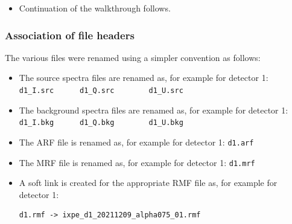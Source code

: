 	\begin{itemize}
		\item Continuation of the walkthrough follows.
	\end{itemize}
	
	\subsubsection*{Association of file headers}
		The various files were renamed using a simpler convention as follows:
		\begin{itemize}
			\item The source spectra files are renamed as, for example for detector 1:\\
			\verb|d1_I.src		d1_Q.src		d1_U.src|
			
			\item The background spectra files are renamed as, for example for detector 1:\\
			\verb|d1_I.bkg		d1_Q.bkg		d1_U.bkg|
			
			\item The ARF file is renamed as, for example for detector 1: \verb|d1.arf|
			
			\item The MRF file is renamed as, for example for detector 1: \verb|d1.mrf|
			
			\item A soft link is created for the appropriate RMF file as, for example for detector 1:
			\begin{verbatim}
d1.rmf -> ixpe_d1_20211209_alpha075_01.rmf
			\end{verbatim}
		\end{itemize}